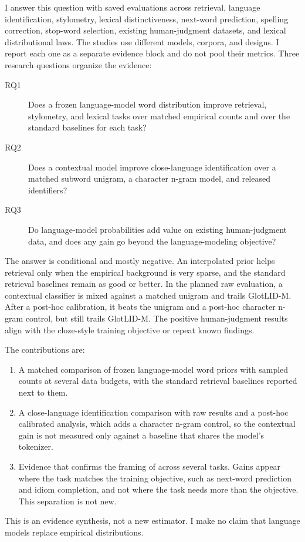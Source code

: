\documentclass[11pt]{article}
\begin{document}
I answer this question with saved evaluations across retrieval, language
identification, stylometry, lexical distinctiveness, next-word prediction,
spelling correction, stop-word selection, existing human-judgment datasets,
and lexical distributional laws. The studies use
different models, corpora, and designs. I report each one as a separate
evidence block and do not pool their metrics. Three research questions
organize the evidence:

\begin{description}
\item[RQ1] Does a frozen language-model word distribution improve retrieval,
stylometry, and lexical tasks over matched empirical counts and over the
standard baselines for each task?
\item[RQ2] Does a contextual model improve close-language identification over
a matched subword unigram, a character n-gram model, and released
identifiers?
\item[RQ3] Do language-model probabilities add value on existing human-judgment
data, and does any gain go beyond the language-modeling objective?
\end{description}

The answer is conditional and mostly negative. An interpolated prior helps
retrieval only when the empirical background is very sparse, and the standard
retrieval baselines remain as good or better. In the planned raw evaluation, a
contextual classifier is mixed against a matched unigram and trails GlotLID-M.
After a post-hoc calibration, it beats the unigram and a post-hoc character
n-gram control, but still trails GlotLID-M. The
positive human-judgment results align with the cloze-style training
objective or repeat known findings.

The contributions are:
\begin{enumerate}
\item A matched comparison of frozen language-model word priors with sampled
counts at several data budgets, with the standard retrieval baselines reported
next to them.
\item A close-language identification comparison with raw results and a
post-hoc calibrated analysis, which adds a character n-gram control, so the
contextual gain is not measured only against a baseline that shares the
model's tokenizer.
\item Evidence that confirms the framing of \citet{trott2026distributional}
across several tasks. Gains appear where the task matches the training
objective, such as next-word prediction and idiom completion, and not where
the task needs more than the objective. This separation is not new.
\end{enumerate}
This is an evidence synthesis, not a new estimator. I make no claim that
language models replace empirical distributions.
\end{document}
